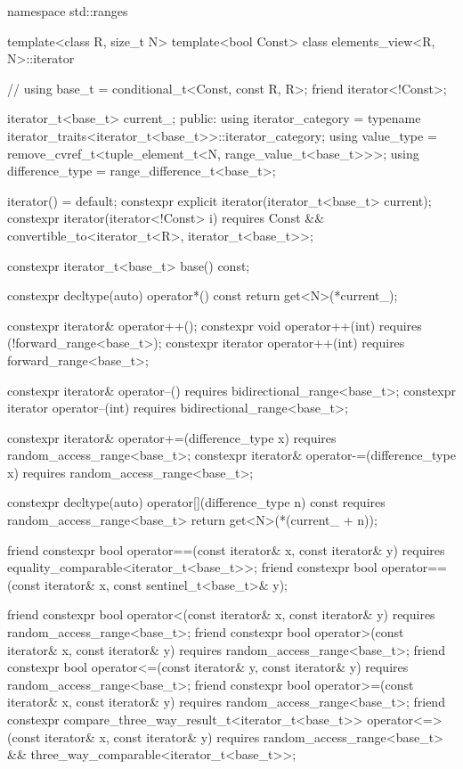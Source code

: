 %
\begin{codeblock}
namespace std::ranges {
  template<class R, size_t N>
  template<bool Const>
  class elements_view<R, N>::iterator {                 // \expos
    using base_t = conditional_t<Const, const R, R>;
    friend iterator<!Const>;

    iterator_t<base_t> current_;
  public:
    using iterator_category = typename iterator_traits<iterator_t<base_t>>::iterator_category;
    using value_type = remove_cvref_t<tuple_element_t<N, range_value_t<base_t>>>;
    using difference_type = range_difference_t<base_t>;

    iterator() = default;
    constexpr explicit iterator(iterator_t<base_t> current);
    constexpr iterator(iterator<!Const> i)
      requires Const && convertible_to<iterator_t<R>, iterator_t<base_t>>;

    constexpr iterator_t<base_t> base() const;

    constexpr decltype(auto) operator*() const
    { return get<N>(*current_); }

    constexpr iterator& operator++();
    constexpr void operator++(int) requires (!forward_range<base_t>);
    constexpr iterator operator++(int) requires forward_range<base_t>;

    constexpr iterator& operator--() requires bidirectional_range<base_t>;
    constexpr iterator operator--(int) requires bidirectional_range<base_t>;

    constexpr iterator& operator+=(difference_type x)
      requires random_access_range<base_t>;
    constexpr iterator& operator-=(difference_type x)
      requires random_access_range<base_t>;

    constexpr decltype(auto) operator[](difference_type n) const
      requires random_access_range<base_t>
    { return get<N>(*(current_ + n)); }

    friend constexpr bool operator==(const iterator& x, const iterator& y)
      requires equality_comparable<iterator_t<base_t>>;
    friend constexpr bool operator==(const iterator& x, const sentinel_t<base_t>& y);

    friend constexpr bool operator<(const iterator& x, const iterator& y)
      requires random_access_range<base_t>;
    friend constexpr bool operator>(const iterator& x, const iterator& y)
      requires random_access_range<base_t>;
    friend constexpr bool operator<=(const iterator& y, const iterator& y)
      requires random_access_range<base_t>;
    friend constexpr bool operator>=(const iterator& x, const iterator& y)
      requires random_access_range<base_t>;
    friend constexpr compare_three_way_result_t<iterator_t<base_t>>
      operator<=>(const iterator& x, const iterator& y)
        requires random_access_range<base_t> && three_way_comparable<iterator_t<base_t>>;

}}
\end{codeblock}
